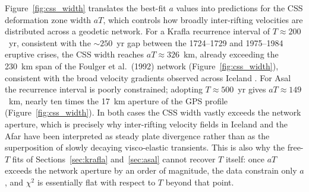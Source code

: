 \documentclass[extra]{gji}
\begin{document}
Figure~\ref{fig:css_width} translates the best-fit $a$ values into
predictions for the CSS deformation zone width $aT$, which controls how broadly
inter-rifting velocities are distributed across a geodetic network.  For a
Krafla recurrence interval of $T \approx 200$~yr, consistent with the
$\sim250$~yr gap between the 1724--1729 and 1975--1984 eruptive crises, the CSS
width reaches $aT \approx 326$~km, already exceeding the 230~km span of the
Foulger et al.\ (1992) network (Figure~\ref{fig:css_width}), consistent with the broad
velocity gradients observed across Iceland \citep{lafemina2005geodetic}.  For Asal the recurrence interval is
poorly constrained; adopting $T \approx 500$~yr gives $aT \approx 149$~km,
nearly ten times the 17~km aperture of the \citet{vigny2007twenty} GPS profile
(Figure~\ref{fig:css_width}).  In both cases the CSS width vastly exceeds the
network aperture, which is precisely why inter-rifting velocity fields in
Iceland and the Afar have been interpreted as steady plate divergence rather than
as the superposition of slowly decaying visco-elastic transients.  This is
also why the free-$T$ fits of Sections~\ref{sec:krafla}
and~\ref{sec:asal} cannot recover $T$ itself: once $aT$ exceeds the
network aperture by an order of magnitude, the data constrain only $a$,
and $\chi^2$ is essentially flat with respect to $T$ beyond that point.
\end{document}
